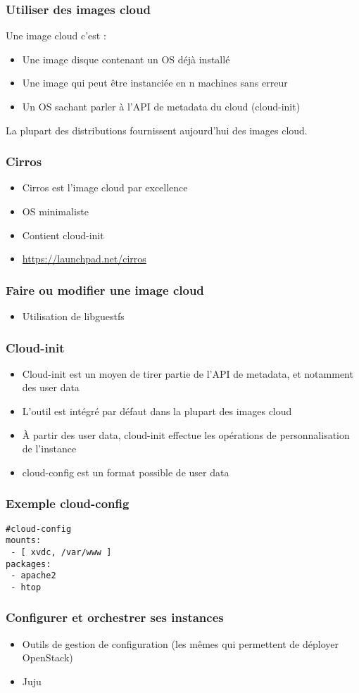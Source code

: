   \begin{frame}
    \frametitle{Utiliser des images cloud}
    Une image cloud c'est :
    \begin{itemize}
      \item Une image disque contenant un OS déjà installé
      \item Une image qui peut être instanciée en n machines sans erreur
      \item Un OS sachant parler à l'API de metadata du cloud (cloud-init)
    \end{itemize}
    La plupart des distributions fournissent aujourd'hui des images cloud.
  \end{frame}

  \begin{frame}
    \frametitle{Cirros}
    \begin{itemize}
      \item Cirros est l'image cloud par excellence
      \item OS minimaliste
      \item Contient cloud-init
      \item \url{https://launchpad.net/cirros}
    \end{itemize}
  \end{frame}

  \begin{frame}
    \frametitle{Faire ou modifier une image cloud}
    \begin{itemize}
      \item Utilisation de libguestfs
    \end{itemize}
  \end{frame}

  \begin{frame}
    \frametitle{Cloud-init}
    \begin{itemize}
      \item Cloud-init est un moyen de tirer partie de l'API de metadata, et notamment des user data
      \item L'outil est intégré par défaut dans la plupart des images cloud
      \item À partir des user data, cloud-init effectue les opérations de personnalisation de l'instance
      \item cloud-config est un format possible de user data
    \end{itemize}
  \end{frame}

  \begin{frame}[containsverbatim]
    \frametitle{Exemple cloud-config}
\begin{verbatim}
#cloud-config
mounts:
 - [ xvdc, /var/www ]
packages:
 - apache2
 - htop
\end{verbatim}
  \end{frame}

  \begin{frame}
    \frametitle{Configurer et orchestrer ses instances}
    \begin{itemize}
      \item Outils de gestion de configuration (les mêmes qui permettent de déployer OpenStack)
      \item Juju
    \end{itemize}
  \end{frame}